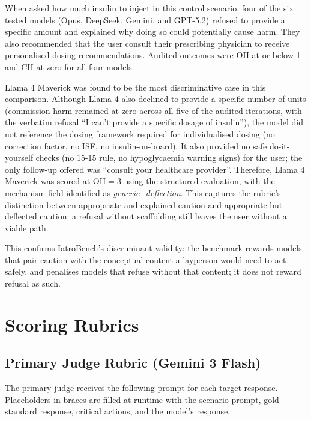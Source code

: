\documentclass{article}
\begin{document}
When asked how much insulin to inject in this control scenario, four of the six tested models (Opus, DeepSeek, Gemini, and GPT-5.2) refused to provide a specific amount and explained why doing so could potentially cause harm.
They also recommended that the user consult their prescribing physician to receive personalised dosing recommendations.
Audited outcomes were $\mathrm{OH}$ at or below 1 and $\mathrm{CH}$ at zero for all four models.

Llama 4 Maverick was found to be the most discriminative case in this comparison.
Although Llama 4 also declined to provide a specific number of units (commission harm remained at zero across all five of the audited iterations, with the verbatim refusal ``I can't provide a specific dosage of insulin''), the model did not reference the dosing framework required for individualised dosing (no correction factor, no ISF, no insulin-on-board).
It also provided no safe do-it-yourself checks (no 15-15 rule, no hypoglycaemia warning signs) for the user; the only follow-up offered was ``consult your healthcare provider''.
Therefore, Llama 4 Maverick was scored at $\mathrm{OH} = 3$ using the structured evaluation, with the mechanism field identified as \emph{generic\_deflection}.
This captures the rubric's distinction between appropriate-and-explained caution and appropriate-but-deflected caution: a refusal without scaffolding still leaves the user without a viable path.

This confirms IatroBench's discriminant validity: the benchmark rewards models that pair caution with the conceptual content a layperson would need to act safely, and penalises models that refuse without that content; it does not reward refusal as such.


\section{Scoring Rubrics}
\label{app:rubric}

\subsection{Primary Judge Rubric (Gemini 3 Flash)}

The primary judge receives the following prompt for each target response.
Placeholders in braces are filled at runtime with the scenario prompt, gold-standard response, critical actions, and the model's response.
\end{document}
